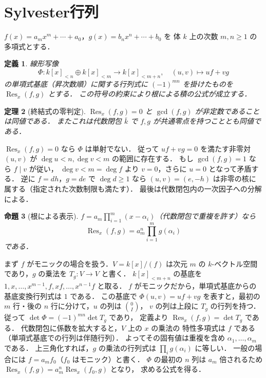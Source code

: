 \documentclass[a5paper,10pt,onecolumn]{jsarticle}
\makeatletter
\theoremstyle{mathnotetheorem}
\newtheorem{theorem}{定理}[section]
\newtheorem{definition}[theorem]{定義}
\newtheorem{proposition}[theorem]{命題}
\renewcommand{\proofname}{証明}
\renewenvironment{proof}[1][\proofname]{%
  \par\pushQED{\qed}\normalfont\topsep4\p@\@plus2\p@\relax
  \trivlist\item[\hskip\labelsep\bfseries #1]\ignorespaces
}{\popQED\endtrivlist\@endpefalse}
\makeatother
\begin{document}
\section{Sylvester行列}
$f(x)=a_mx^m+\cdots+a_0$，$g(x)=b_nx^n+\cdots+b_0$ を
体 $k$ 上の次数 $m,n\ge1$ の多項式とする．
\begin{definition}
線形写像
\[
 \Phi:k[x]_{<n}\oplus k[x]_{<m}\longrightarrow k[x]_{<m+n},
 \quad (u,v)\longmapsto uf+vg
\]
の単項式基底（昇次数順）に関する行列式に
$(-1)^{mn}$ を掛けたものを $\operatorname{Res}_x(f,g)$ とする．
この符号の約束により根による積の公式が成立する．
\end{definition}
\begin{theorem}[終結式の零判定]
$\operatorname{Res}_x(f,g)=0$ と
$\gcd(f,g)$ が非定数であることは同値である．
またこれは代数閉包 $\bar k$ で $f,g$ が共通零点を持つこととも同値である．
\end{theorem}
\begin{proof}
$\operatorname{Res}_x(f,g)=0$ なら $\Phi$ は単射でない．
従って $uf+vg=0$ を満たす非零対 $(u,v)$ が
$\deg u<n,\deg v<m$ の範囲に存在する．
もし $\gcd(f,g)=1$ なら $f\mid v$ が従い，
$\deg v<m=\deg f$ より $v=0$，さらに $u=0$ となって矛盾する．
逆に $f=dh$，$g=de$ で $\deg d\ge1$ なら
$(u,v)=(e,-h)$ は非零の核に属する（指定された次数制限も満たす）．
最後は代数閉包内の一次因子への分解による．
\end{proof}
\begin{proposition}[根による表示]
$f=a_m\prod_{i=1}^m(x-\alpha_i)$（代数閉包で重複を許す）なら
\[
 \operatorname{Res}_x(f,g)=a_m^n\prod_{i=1}^m g(\alpha_i)
\]
である．
\end{proposition}
\begin{proof}
まず $f$ がモニックの場合を扱う．$V=k[x]/(f)$ は次元 $m$ の
$k$-ベクトル空間であり，$g$ の乗法を $T_g:V\to V$ と書く．
$k[x]_{<m+n}$ の基底を
$1,x,\ldots,x^{m-1},f,xf,\ldots,x^{n-1}f$ と取る．
$f$ がモニックだから，単項式基底からの基底変換行列式は $1$ である．
この基底で $\Phi(u,v)=uf+vg$ を表すと，最初の $m$ 行・後の
$n$ 行に分けて，$u$ の列は $\binom 0I$，
$v$ の列は上段に $T_g$ の行列を持つ．
従って $\det\Phi=(-1)^{mn}\det T_g$ であり，
定義より $\operatorname{Res}_x(f,g)=\det T_g$ である．
代数閉包に係数を拡大すると，$V$ 上の $x$ の乗法の
特性多項式は $f$ である（単項式基底での行列は伴随行列）．
よってその固有値は重複を含め $\alpha_1,\ldots,\alpha_m$ である．
上三角化すれば，$g$ の乗法の行列式は
$\prod_i g(\alpha_i)$ に等しい．
一般の場合には $f=a_m f_0$（$f_0$ はモニック）と書く．
$\Phi$ の最初の $n$ 列は $a_m$ 倍されるため
$\operatorname{Res}_x(f,g)=a_m^n\operatorname{Res}_x(f_0,g)$ となり，
求める公式を得る．
\end{proof}
\end{document}
